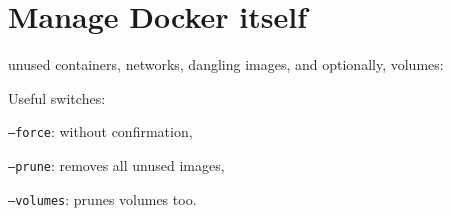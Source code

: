 \section{Manage Docker itself}
 unused containers, networks, dangling images, and optionally, volumes:

Useful switches:
\begin{compactitem}
	\item \texttt{--force}: without confirmation,
	\item \texttt{--prune}: removes all unused images,
    \item \texttt{--volumes}: prunes volumes too.
\end{compactitem}
